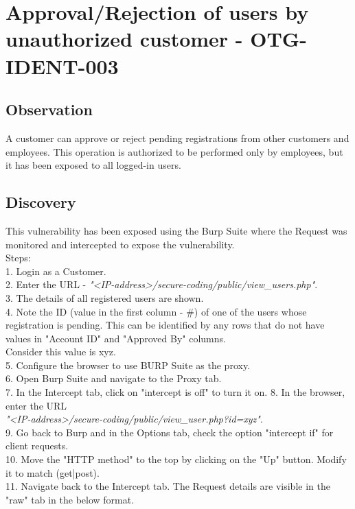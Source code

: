 \section{Approval/Rejection of users by unauthorized customer - OTG-IDENT-003}

\subsection{Observation}
A customer can approve or reject pending registrations from other customers and employees. This operation is authorized to be performed only by employees, but it has been exposed to all logged-in users. 

\subsection{Discovery}
This vulnerability has been exposed using the Burp Suite where the Request was monitored and intercepted to expose the vulnerability.\\
Steps: \\
1. Login as a Customer. \\
2. Enter the URL -  \textit{"<IP-address>/secure-coding/public/view\_users.php"}. \\
3. The details of all registered users are shown. \\
4. Note the ID (value in the first column - \#) of one of the users whose registration is pending. This can be identified by any rows that do not have values in "Account ID" and "Approved By" columns.\\
Consider this value is xyz. \\
5. Configure the browser to use BURP Suite as the proxy. \\
6. Open Burp Suite and navigate to the Proxy tab. \\
7. In the Intercept tab, click on "intercept is off" to turn it on.
8. In the browser, enter the URL \\
\textit{"<IP-address>/secure-coding/public/view\_user.php?id=xyz"}. \\
9. Go back to Burp and in the Options tab, check the option "intercept if" for client requests. \\
10. Move the "HTTP method" to the top by clicking on the "Up" button. Modify it to match (get|post). \\
11. Navigate back to the Intercept tab. The Request details are visible in the "raw" tab in the below format. \\ 
